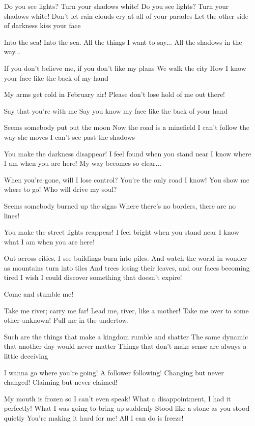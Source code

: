 Do you see lights? Turn your shadows white!
Do you see lights?
Turn your shadows white!
Don't let rain clouds cry at all of your parades
Let the other side of darkness kiss your face

Into the sea! Into the sea.
All the things I want to say...
All the shadows in the way...


If you don't believe me, if you don't like my plans
We walk the city
How I know your face like the back of my hand

My arms get cold in February air!
Please don't lose hold of me out there!

Say that you're with me
Say you know my face like the back of your hand


Seems somebody put out the moon
Now the road is a minefield
I can't follow the way she moves
I can't see past the shadows

You make the darkness disappear!
I feel found when you stand near
I know where I am when you are here!
My way becomes so clear...

When you're gone, will I lose control?
You're the only road I know!
You show me where to go!
Who will drive my soul?

Seems somebody burned up the signs
Where there's no borders, there are no lines!

You make the street lights reappear!
I feel bright when you stand near
I know what I am when you are here!


Out across cities, I see buildings burn into piles.
And watch the world in wonder as mountains turn into tiles
And trees losing their leaves, and our faces becoming tired
I wish I could discover something that doesn't expire!

Come and stumble me!

Take me river; carry me far!
Lead me, river, like a mother!
Take me over to some other unknown!
Pull me in the undertow.

Such are the things that make a kingdom rumble and shatter
The same dynamic that another day would never matter
Things that don't make sense are always a little deceiving

I wanna go where you're going!
A follower following!
Changing but never changed!
Claiming but never claimed!


My mouth is frozen so I can't even speak!
What a disappointment, I had it perfectly!
What I was going to bring up suddenly
Stood like a stone as you stood quietly
You're making it hard for me! All I can do is freeze!

